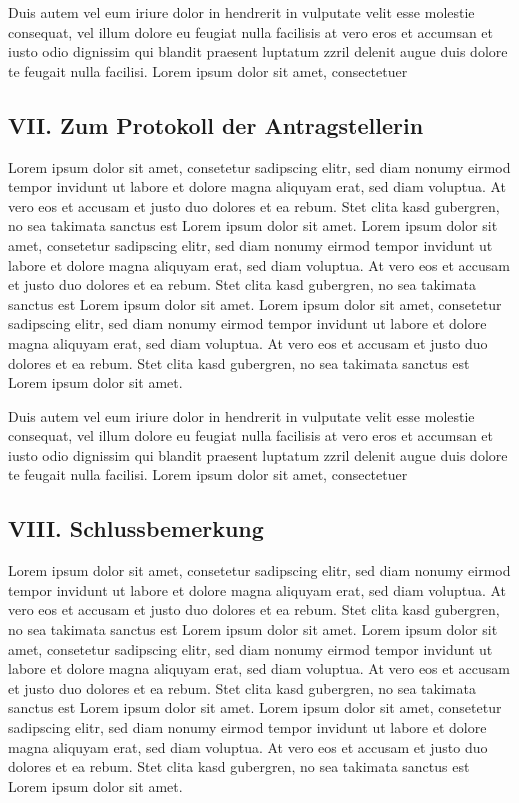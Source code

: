 \documentclass[
  12pt,
  a4paper,
]{article}
\begin{document}
Duis autem vel eum iriure dolor in hendrerit in vulputate velit esse
molestie consequat, vel illum dolore eu feugiat nulla facilisis at vero
eros et accumsan et iusto odio dignissim qui blandit praesent luptatum
zzril delenit augue duis dolore te feugait nulla facilisi. Lorem ipsum
dolor sit amet, consectetuer

\subsection{VII. Zum Protokoll der
Antragstellerin}\label{vii.-zum-protokoll-der-antragstellerin}

Lorem ipsum dolor sit amet, consetetur sadipscing elitr, sed diam nonumy
eirmod tempor invidunt ut labore et dolore magna aliquyam erat, sed diam
voluptua. At vero eos et accusam et justo duo dolores et ea rebum. Stet
clita kasd gubergren, no sea takimata sanctus est Lorem ipsum dolor sit
amet. Lorem ipsum dolor sit amet, consetetur sadipscing elitr, sed diam
nonumy eirmod tempor invidunt ut labore et dolore magna aliquyam erat,
sed diam voluptua. At vero eos et accusam et justo duo dolores et ea
rebum. Stet clita kasd gubergren, no sea takimata sanctus est Lorem
ipsum dolor sit amet. Lorem ipsum dolor sit amet, consetetur sadipscing
elitr, sed diam nonumy eirmod tempor invidunt ut labore et dolore magna
aliquyam erat, sed diam voluptua. At vero eos et accusam et justo duo
dolores et ea rebum. Stet clita kasd gubergren, no sea takimata sanctus
est Lorem ipsum dolor sit amet.

Duis autem vel eum iriure dolor in hendrerit in vulputate velit esse
molestie consequat, vel illum dolore eu feugiat nulla facilisis at vero
eros et accumsan et iusto odio dignissim qui blandit praesent luptatum
zzril delenit augue duis dolore te feugait nulla facilisi. Lorem ipsum
dolor sit amet, consectetuer

\subsection{VIII. Schlussbemerkung}\label{viii.-schlussbemerkung}

Lorem ipsum dolor sit amet, consetetur sadipscing elitr, sed diam nonumy
eirmod tempor invidunt ut labore et dolore magna aliquyam erat, sed diam
voluptua. At vero eos et accusam et justo duo dolores et ea rebum. Stet
clita kasd gubergren, no sea takimata sanctus est Lorem ipsum dolor sit
amet. Lorem ipsum dolor sit amet, consetetur sadipscing elitr, sed diam
nonumy eirmod tempor invidunt ut labore et dolore magna aliquyam erat,
sed diam voluptua. At vero eos et accusam et justo duo dolores et ea
rebum. Stet clita kasd gubergren, no sea takimata sanctus est Lorem
ipsum dolor sit amet. Lorem ipsum dolor sit amet, consetetur sadipscing
elitr, sed diam nonumy eirmod tempor invidunt ut labore et dolore magna
aliquyam erat, sed diam voluptua. At vero eos et accusam et justo duo
dolores et ea rebum. Stet clita kasd gubergren, no sea takimata sanctus
est Lorem ipsum dolor sit amet.
\end{document}
